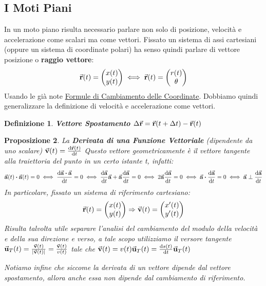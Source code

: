 \documentclass{article}
\newtheorem{defn}{Definizione}[section]
\newtheorem{prop}[defn]{Proposizione}
\newcommand{\then}{\ensuremath{\Rightarrow}}
\renewcommand{\a}{\va{a}}
\renewcommand{\v}{\va{v}}
\renewcommand{\u}{\va{u}}
\renewcommand{\r}{\va{r}}
\begin{document}
\subsection{I Moti Piani}

In un moto piano risulta necessario parlare non solo di posizione, velocità e accelerazione come scalari ma come vettori.
Fissato un sistema di assi cartesiani (oppure un sistema di coordinate polari) ha senso quindi parlare di vettore posizione o \textbf{raggio vettore}:
\[\r(t)=\begin{pmatrix}x(t)\\y(t)\\\end{pmatrix}\iff \r(t)=\begin{pmatrix}r(t)\\\theta\\\end{pmatrix}\]
Usando le già note \hyperlink{formulecoordinate}{Formule di Cambiamento delle Coordinate}. Dobbiamo quindi generalizzare la definizione di velocità e accelerazione come vettori.

\begin{defn}
\textbf{Vettore Spostamento} \(\Delta\r=\r(t+\Delta t)-\r(t)\)
\end{defn}

\begin{prop}
La \textbf{Derivata di una Funzione Vettoriale} (dipendente da uno scalare) \(\v(t)=\dv{\r(t)}{t}\)
Questo vettore geometricamente è il vettore tangente alla traiettoria del punto in un certo istante t, infatti:
\[\a(t)\vdot\a(t)=0\iff \dv{\a\vdot\a}{t}=0\iff \dv{\a}{t}\a+\a\dv{\a}{t}=0\iff 2\a\dv{\a}{t}=0\iff \a\vdot\dv{\a}{t}=0\iff \a\perp\dv{\a}{t}\]
In particolare, fissato un sistema di riferimento cartesiano:
\[\r(t)=\begin{pmatrix}x(t)\\y(t)\\\end{pmatrix}\then\v(t)=\begin{pmatrix}x'(t)\\y'(t)\\\end{pmatrix}\]
Risulta talvolta utile separare l'analisi del cambiamento del modulo della velocità e della sua direzione e verso, a tale scopo utilizziamo il versore tangente \(\u_T(t)=\frac{\v(t)}{|\v(t)|}=\frac{\v(t)}{v(t)}\) tale che \(\v(t)=v(t)\u_T(t)=\dv{s(t)}{t}\u_T(t)\)

Notiamo infine che siccome la derivata di un vettore dipende dal vettore spostamento, allora anche essa non dipende dal cambiamento di riferimento.
\end{prop}
\end{document}

